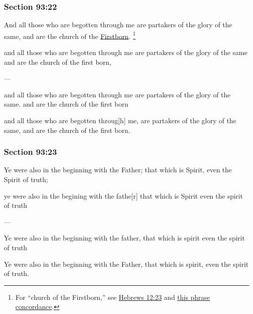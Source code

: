 	\subsubsection{Section 93:22} %
		\label{DC93-22}

		And all those who are begotten through me are partakers of the glory of the same, and are the church of the \hyperref[FIRSTBORN]{Firstborn}.%
			\footnote{%
				For ``church of the Firstborn,'' see \hyperref[HEBREWS-12-23]{Hebrews 12:23} and \hyperref[CHURCH-PHRASES]{this phrase concordance}.
				}

		\begin{framed}
		\scriptsize
			\begin{compactdesc}
				\item[JSP] and all those who are begotten through me are partakers of the glory of the same and are the church of the first born,
				\item[BC] ---
				\item[RB2] and all those who are begotten through me are partakers of the glory of the same. and are the church of the first born 
				\item[RB1] and all those who are begotten throug[h] me, are partakers of the glory of the same, and are the church of the first born. 
			\end{compactdesc}
		\end{framed}

	\subsubsection{Section 93:23} %
		\label{DC93-23}

		Ye were also in the beginning with the Father; that which is Spirit, even the Spirit of truth;

		\begin{framed}
		\scriptsize
			\begin{compactdesc}
				\item[JSP] ye were also in the begining with the fathe[r] that which is Spirit even the spirit of truth
				\item[BC] ---
				\item[RB2] Ye were also in the beginning with the father, that which is spirit even the spirit of truth 
				\item[RB1] Ye were also in the beginning with the Father, that which is spirit, even the spirit of truth. 
			\end{compactdesc}
		\end{framed}

